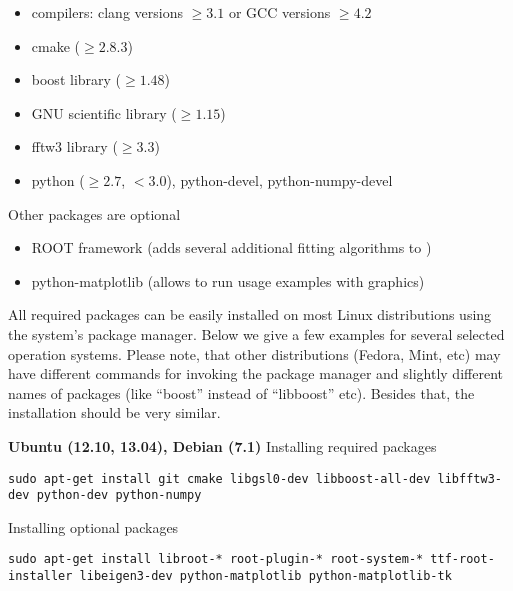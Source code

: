 \begin{itemize}
\item compilers: clang  versions $\geq 3.1$ or GCC versions $\geq 4.2$
\item cmake ($\geq 2.8.3$)
\item boost library ($\geq 1.48$)
\item GNU scientific library ($\geq 1.15$)
\item fftw3 library ($\geq 3.3$)
\item python ($\geq 2.7$, $< 3.0$), python-devel, python-numpy-devel
\end{itemize}
\vspace*{2mm}

Other packages are optional
\begin{itemize}
\item ROOT framework (adds several additional fitting algorithms to \BornAgain)
\item python-matplotlib (allows to run usage examples with graphics)
\end{itemize}

All required packages can be easily installed on most Linux distributions using the system's package
manager. Below we give a few examples for several selected operation systems. Please note,
that other distributions (Fedora, Mint, etc) may have different commands for invoking the package manager and slightly different names of packages (like ``boost'' instead of ``libboost'' etc). Besides that, the installation should be very similar.
\vspace*{3mm}


\noindent
{\large\bf Ubuntu (12.10, 13.04), Debian (7.1)} \newline
Installing required packages
\begin{lstlisting}[language=shell, style=commandline]
sudo apt-get install git cmake libgsl0-dev libboost-all-dev libfftw3-dev python-dev python-numpy
\end{lstlisting}

\noindent
Installing optional packages
\begin{lstlisting}[language=shell, style=commandline]
sudo apt-get install libroot-* root-plugin-* root-system-* ttf-root-installer libeigen3-dev python-matplotlib python-matplotlib-tk
\end{lstlisting}
\vspace*{3mm}


